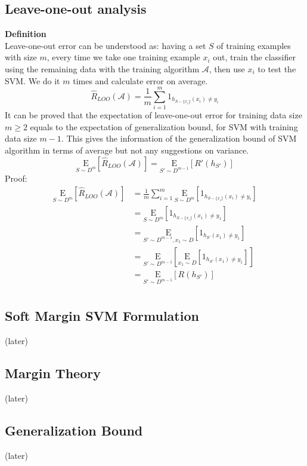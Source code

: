 \documentclass[12pt]{article}
\theoremstyle{definition}
\theoremstyle{remark}
\numberwithin{equation}{section}
\begin{document}
\subsection{Leave-one-out analysis}
\textbf{Definition} \\[0.2cm]
Leave-one-out error can be understood as: having a set $S$ of training examples with size $m$, every time we take one training example $x_i$ out, train the classifier using the remaining data with the training algorithm $\mathcal{A}$, then use $x_i$ to test the SVM. We do it $m$ times and calculate error on average.
\[\widehat{R}_{LOO}(\mathcal{A})=\frac{1}{m}\sum_{i=1}^{m}1_{h_{S-\{x_i\}}(x_i)\neq y_i}\]
It can be proved that the expectation of leave-one-out error for training data size $m\geq 2$ equals to the expectation of generalization bound, for SVM with training data size $m-1$. This gives the information of the generalization bound of SVM algorithm in terms of average but not any suggestions on variance.
\[\underset{S\sim D^m}{\mathrm{E}}[\widehat{R}_{LOO}(\mathcal{A})]=\underset{S'\sim D^{m-1}}{\mathrm{E}}[R'(h_{S'})]\]
Proof:
\begin{align*}
\underset{S\sim D^m}{\mathrm{E}} [\widehat{R}_{LOO}(\mathcal{A})]  &= \frac{1}{m} \sum_{i=1}^m \underset{S \sim D^m}{\mathrm{E}}[1_{h_{S-\{x_i\}}(x_i)\neq y_i}] \\
                                                                   &= \underset{S \sim D^m}{\mathrm{E}}[1_{h_{S-\{x_i\}}(x_1)\neq y_1}] \\
                                                                   &= \underset{S' \sim D^{m-1}, x_1 \sim D}{\mathrm{E}}[1_{h_{S'}(x_1)\neq y_1}] \\
                                                                   &= \underset{S' \sim D^{m-1}}{\mathrm{E}}[\underset{x_1 \sim D}{\mathrm{E}}[1_{h_{S'}(x_1)\neq y_1}]] \\
                                                                   &= \underset{S' \sim D^{m-1}}{\mathrm{E}}[R(h_{S'})] \\
\end{align*}
\subsection{Soft Margin SVM Formulation}
(later)
\subsection{Margin Theory}
(later)
\subsection{Generalization Bound}
(later)
\end{document}
